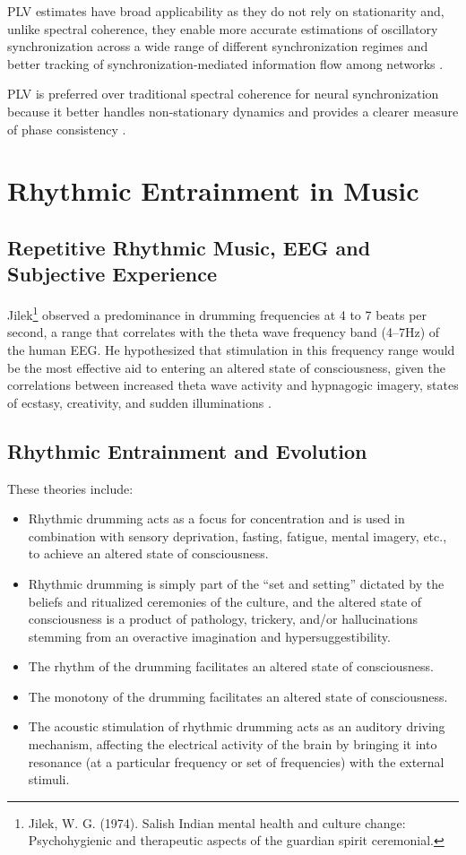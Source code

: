 \documentclass{article}
\begin{document}
PLV estimates have broad applicability as they do not rely on stationarity and, unlike spectral coherence, they enable more accurate estimations of oscillatory synchronization across a wide range of different synchronization regimes and better tracking of synchronization-mediated information flow among networks \citep{lowet2016}.

PLV is preferred over traditional spectral coherence for neural synchronization because it better handles non-stationary dynamics and provides a clearer measure of phase consistency \citep{Schmidt2014}.

\section{Rhythmic Entrainment in Music}

\subsection{Repetitive Rhythmic Music, EEG and Subjective Experience}

Jilek\footnote{Jilek, W. G. (1974). Salish Indian mental health and culture change: Psychohygienic and therapeutic aspects of the guardian spirit ceremonial.} observed a predominance in drumming frequencies at 4 to 7 beats per second, a range that correlates with the theta wave frequency band (4--7Hz) of the human EEG. He hypothesized that stimulation in this frequency range would be the most effective aid to entering an altered state of consciousness, given the correlations between increased theta wave activity and hypnagogic imagery, states of ecstasy, creativity, and sudden illuminations \citep{achterberg1985,green1977}.

\subsection{Rhythmic Entrainment and Evolution}

These theories include:

\begin{itemize}
    \item Rhythmic drumming acts as a focus for concentration and is used in combination with sensory deprivation, fasting, fatigue, mental imagery, etc., to achieve an altered state of consciousness.
    \item Rhythmic drumming is simply part of the “set and setting” dictated by the beliefs and ritualized ceremonies of the culture, and the altered state of consciousness is a product of pathology, trickery, and/or hallucinations stemming from an overactive imagination and hypersuggestibility.
    \item The rhythm of the drumming facilitates an altered state of consciousness.
    \item The monotony of the drumming facilitates an altered state of consciousness.
    \item The acoustic stimulation of rhythmic drumming acts as an auditory driving mechanism, affecting the electrical activity of the brain by bringing it into resonance (at a particular frequency or set of frequencies) with the external stimuli.
\end{itemize}
\end{document}
